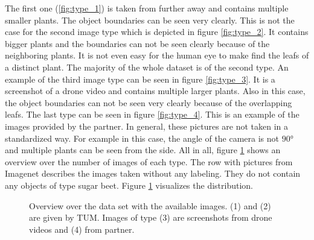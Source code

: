 The first one (\ref{fig:type_1}) is taken from further away and contains multiple smaller plants. The object boundaries can be seen very clearly. This is not the case for the second image type which is depicted in figure \ref{fig:type_2}. It contains bigger plants and the boundaries can not be seen clearly because of the neighboring plants. It is not even easy for the human eye to make find the leafs of a distinct plant. The majority of the whole dataset is of the second type. An example of the third image type can be seen in figure \ref{fig:type_3}. It is a screenshot of a drone video and contains multiple larger plants. Also in this case, the object boundaries can not be seen very clearly because of the overlapping leafs. The last type can be seen in figure \ref{fig:type_4}. This is an example of the images provided by the partner. In general, these pictures are not taken in a standardized way. For example in this case, the angle of the camera is not $ 90° $ and multiple plants can be seen from the side. All in all, figure \ref{fig:bar_chart} shows an overview over the number of images of each type. The row with pictures from Imagenet describes the images taken without any labeling. They do not contain any objects of type sugar beet. Figure \ref{fig:bar_chart} visualizes the distribution. \\

\begin{figure}
	\centering
{}
\caption{Overview over the data set with the available images. (1) and (2) are given by TUM. Images of type (3) are screenshots from drone videos and (4) from partner.}
\label{fig:bar_chart}
\end{figure}

